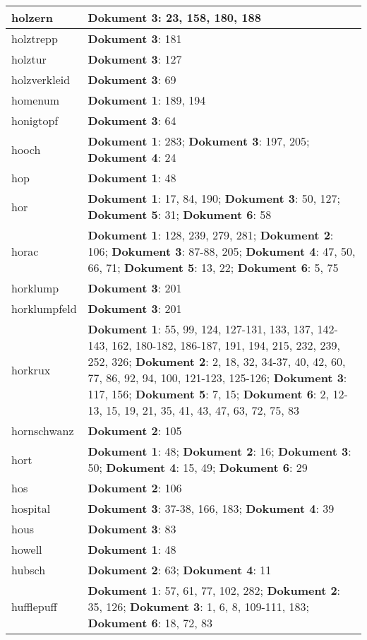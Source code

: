 \documentclass[a5paper]{article}
\begin{document}
\begin{longtable}[l]{|l|p{3in}|}
holzern & \textbf{Dokument 3}: 23, 158, 180, 188 \\
\hline
holztrepp & \textbf{Dokument 3}: 181 \\
\hline
holztur & \textbf{Dokument 3}: 127 \\
\hline
holzverkleid & \textbf{Dokument 3}: 69 \\
\hline
homenum & \textbf{Dokument 1}: 189, 194 \\
\hline
honigtopf & \textbf{Dokument 3}: 64 \\
\hline
hooch & \textbf{Dokument 1}: 283; \textbf{Dokument 3}: 197, 205; \textbf{Dokument 4}: 24 \\
\hline
hop & \textbf{Dokument 1}: 48 \\
\hline
hor & \textbf{Dokument 1}: 17, 84, 190; \textbf{Dokument 3}: 50, 127; \textbf{Dokument 5}: 31; \textbf{Dokument 6}: 58 \\
\hline
horac & \textbf{Dokument 1}: 128, 239, 279, 281; \textbf{Dokument 2}: 106; \textbf{Dokument 3}: 87-88, 205; \textbf{Dokument 4}: 47, 50, 66, 71; \textbf{Dokument 5}: 13, 22; \textbf{Dokument 6}: 5, 75 \\
\hline
horklump & \textbf{Dokument 3}: 201 \\
\hline
horklumpfeld & \textbf{Dokument 3}: 201 \\
\hline
horkrux & \textbf{Dokument 1}: 55, 99, 124, 127-131, 133, 137, 142-143, 162, 180-182, 186-187, 191, 194, 215, 232, 239, 252, 326; \textbf{Dokument 2}: 2, 18, 32, 34-37, 40, 42, 60, 77, 86, 92, 94, 100, 121-123, 125-126; \textbf{Dokument 3}: 117, 156; \textbf{Dokument 5}: 7, 15; \textbf{Dokument 6}: 2, 12-13, 15, 19, 21, 35, 41, 43, 47, 63, 72, 75, 83 \\
\hline
hornschwanz & \textbf{Dokument 2}: 105 \\
\hline
hort & \textbf{Dokument 1}: 48; \textbf{Dokument 2}: 16; \textbf{Dokument 3}: 50; \textbf{Dokument 4}: 15, 49; \textbf{Dokument 6}: 29 \\
\hline
hos & \textbf{Dokument 2}: 106 \\
\hline
hospital & \textbf{Dokument 3}: 37-38, 166, 183; \textbf{Dokument 4}: 39 \\
\hline
hous & \textbf{Dokument 3}: 83 \\
\hline
howell & \textbf{Dokument 1}: 48 \\
\hline
hubsch & \textbf{Dokument 2}: 63; \textbf{Dokument 4}: 11 \\
\hline
hufflepuff & \textbf{Dokument 1}: 57, 61, 77, 102, 282; \textbf{Dokument 2}: 35, 126; \textbf{Dokument 3}: 1, 6, 8, 109-111, 183; \textbf{Dokument 6}: 18, 72, 83 \\

\end{longtable}
\end{document}
